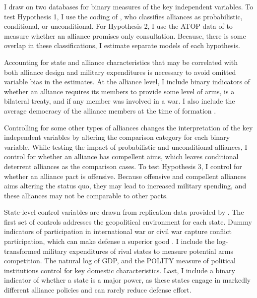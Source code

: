 \documentclass[12pt]{article}
\begin{document}
I draw on two databases for binary measures of the key independent variables. To test Hypothesis 1, I use the coding of \citet{Benson2012}, who classifies alliances as probabilistic, conditional, or unconditional. For Hypothesis 2, I use the ATOP data of \citet{Leedsetal2002} to measure whether an alliance promises only consultation.  Because, there is some overlap in these classifications, I estimate separate models of each hypothesis. 

Accounting for state and alliance characteristics that may be correlated with both alliance design and military expenditures is necessary to avoid omitted variable bias in the estimates. At the alliance level, I include binary indicators of whether an alliance requires its members to provide some level of arms, is a bilateral treaty, and if any member was involved in a war. I also include the average democracy of the alliance members at the time of formation \citep{Chibaetal2015}. 

Controlling for some other types of alliances changes the interpretation of the key independent variables by altering the comparison category for each binary variable. While testing the impact of probabilistic and unconditional alliances, I control for whether an alliance has compellent aims, which leaves conditional deterrent alliances as the comparison cases. To test Hypothesis 3, I control for whether an alliance pact is offensive. Because offensive and compellent alliances aims altering the status quo, they may lead to increased military spending, and these alliances may not be comparable to other pacts.   

State-level control variables are drawn from replication data provided by \citet{DigiuseppePoast2016}. The first set of controls addresses the geopolitical environment for each state. Dummy indicators of participation in international war or civil war capture conflict participation, which can make defense a superior good \citep{OlsonZeckhauser1966}. I include the log-transformed military expenditures of rival states to measure potential arms competition. The natural log of GDP, and the POLITY measure of political institutions control for key domestic characteristics. Last, I include a binary indicator of whether a state is a major power, as these states engage in markedly different alliance policies and can rarely reduce defense effort. 



















  
% 
\end{document}
